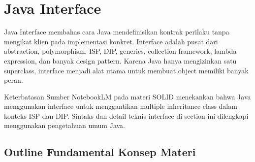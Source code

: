 \section{Java Interface}

Java Interface membahas cara Java mendefinisikan kontrak perilaku tanpa mengikat klien pada implementasi konkret. Interface adalah pusat dari abstraction, polymorphism, ISP, DIP, generics, collection framework, lambda expression, dan banyak design pattern. Karena Java hanya mengizinkan satu superclass, interface menjadi alat utama untuk membuat object memiliki banyak peran.

\begin{cmt}{Keterbatasan Sumber}{}
NotebookLM pada materi SOLID menekankan bahwa Java menggunakan interface untuk menggantikan multiple inheritance class dalam konteks ISP dan DIP. Sintaks dan detail teknis interface di section ini dilengkapi menggunakan pengetahuan umum Java.
\end{cmt}

\subsection{Outline Fundamental Konsep Materi}

